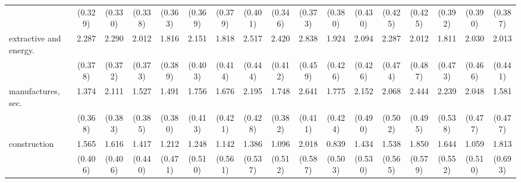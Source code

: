 {\begin{tabular}{l*{16}{c}}
                    &     (0.329)         &     (0.330)         &     (0.338)         &     (0.363)         &     (0.369)         &     (0.379)         &     (0.401)         &     (0.346)         &     (0.373)         &     (0.380)         &     (0.430)         &     (0.425)         &     (0.425)         &     (0.392)         &     (0.390)         &     (0.387)         \\
[1em]
extractive and energy.&       2.287\sym{***}&       2.290\sym{***}&       2.012\sym{***}&       1.816\sym{***}&       2.151\sym{***}&       1.818\sym{***}&       2.517\sym{***}&       2.420\sym{***}&       2.838\sym{***}&       1.924\sym{***}&       2.094\sym{***}&       2.287\sym{***}&       2.012\sym{***}&       1.811\sym{***}&       2.030\sym{***}&       2.013\sym{***}\\
                    &     (0.378)         &     (0.372)         &     (0.373)         &     (0.389)         &     (0.403)         &     (0.414)         &     (0.444)         &     (0.412)         &     (0.459)         &     (0.426)         &     (0.426)         &     (0.474)         &     (0.487)         &     (0.473)         &     (0.466)         &     (0.441)         \\
[1em]
manufactures, sec.  &       1.374\sym{***}&       2.111\sym{***}&       1.527\sym{***}&       1.491\sym{***}&       1.756\sym{***}&       1.676\sym{***}&       2.195\sym{***}&       1.748\sym{***}&       2.641\sym{***}&       1.775\sym{***}&       2.152\sym{***}&       2.068\sym{***}&       2.444\sym{***}&       2.239\sym{***}&       2.048\sym{***}&       1.581\sym{***}\\
                    &     (0.368)         &     (0.383)         &     (0.385)         &     (0.380)         &     (0.413)         &     (0.421)         &     (0.428)         &     (0.382)         &     (0.411)         &     (0.424)         &     (0.490)         &     (0.502)         &     (0.495)         &     (0.538)         &     (0.477)         &     (0.477)         \\
[1em]
construction        &       1.565\sym{***}&       1.616\sym{***}&       1.417\sym{**} &       1.212\sym{*}  &       1.248\sym{*}  &       1.142\sym{*}  &       1.386\sym{**} &       1.096\sym{*}  &       2.018\sym{***}&       0.839         &       1.434\sym{**} &       1.538\sym{**} &       1.850\sym{**} &       1.644\sym{**} &       1.059\sym{*}  &       1.813\sym{**} \\
                    &     (0.406)         &     (0.406)         &     (0.440)         &     (0.471)         &     (0.510)         &     (0.561)         &     (0.537)         &     (0.512)         &     (0.587)         &     (0.503)         &     (0.530)         &     (0.565)         &     (0.579)         &     (0.552)         &     (0.510)         &     (0.693)         \\

\end{tabular}}

